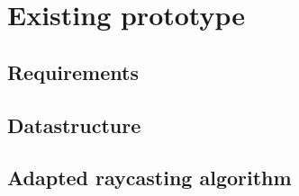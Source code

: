 \section{Existing prototype}

\subsection{Requirements}

\subsection{Datastructure}


\subsection{Adapted raycasting algorithm}
